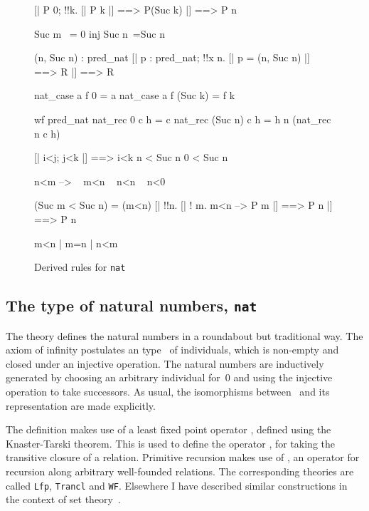 \begin{figure} \underscoreon
\begin{ttbox}
     [| P 0; !!k. [| P k |] ==> P(Suc k) |]  ==> P n

   Suc m ~= 0
        inj Suc
    n~=Suc n

      (n, Suc n) : pred_nat
    [| p : pred_nat;  !!x n. [| p = (n, Suc n) |] ==> R |] ==> R

     nat_case a f 0 = a
   nat_case a f (Suc k) = f k

    wf pred_nat
      nat_rec 0 c h = c
    nat_rec (Suc n) c h = h n (nat_rec n c h)

     [| i<j;  j<k |] ==> i<k
          n < Suc n
  0 < Suc n

   n<m --> ~ m<n 
  ~ n<n
      ~ n<0

    (Suc m < Suc n) = (m<n)
    [| !!n. [| ! m. m<n --> P m |] ==> P n |]  ==>  P n

    m<n | m=n | n<m
\end{ttbox}
\caption{Derived rules for {\tt nat}} \label{chol-nat2}
\end{figure}


\subsection{The type of natural numbers, {\tt nat}}
The theory  defines the natural numbers in a roundabout but
traditional way.  The axiom of infinity postulates an type~ of
individuals, which is non-empty and closed under an injective operation.
The natural numbers are inductively generated by choosing an arbitrary
individual for~0 and using the injective operation to take successors.  As
usual, the isomorphisms between~ and its representation are made
explicitly.

The definition makes use of a least fixed point operator ,
defined using the Knaster-Tarski theorem.  This is used to define the
operator , for taking the transitive closure of a relation.
Primitive recursion makes use of , an operator for recursion
along arbitrary well-founded relations.  The corresponding theories are
called {\tt Lfp}, {\tt Trancl} and {\tt WF}\@.  Elsewhere I have described
similar constructions in the context of set theory~\cite{paulson-set-II}.

